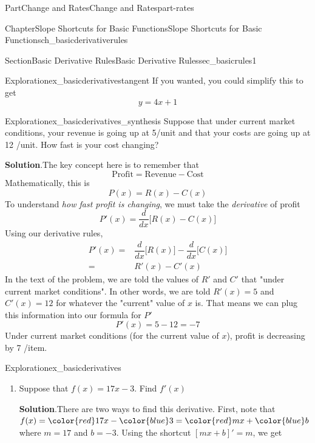 \documentclass[oneside,10pt,]{tufte-book}
\newcommand{\blocktitlefont}{\relax}
\numberwithin{equation}{chapter}
\newcommand{\red}[1]{   {\color{red}   #1}   }
\newcommand{\blue}[1]{  {\color{blue}  #1}  }
\newcommand{\ddx}[1]{ \dfrac{d}{dx} \Big[ #1 \Big]  }
\newcommand{\amp}{&}
\begin{document}
\begin{partptx}{Part}{Change and Rates}{}{Change and Rates}{}{}{part-rates}
\begin{chapterptx}{Chapter}{Slope Shortcuts for Basic Functions}{}{Slope Shortcuts for Basic Functions}{}{}{ch_basicderivativerules}
\begin{sectionptx}{Section}{Basic Derivative Rules}{}{Basic Derivative Rules}{}{}{sec_basicrules1}
\begin{exploration}{Exploration}{}{ex_basicderivativestangent}
If you wanted, you could simplify this to get%
\begin{equation*}
y = 4x + 1
\end{equation*}
%
\end{exploration}%
\begin{exploration}{Exploration}{}{ex_basicderivatives_synthesis}%
Suppose that under current market conditions, your revenue is going up at 5\textdollar{}\slash{}unit and that your costs are going up at 12 \textdollar{}\slash{}unit.  How fast is your cost changing?%
\par\smallskip%
\noindent\textbf{\blocktitlefont Solution}.\hypertarget{ex_basicderivatives_synthesis-2}{}\quad{}The key concept here is to remember that%
\begin{equation*}
\text{Profit} = \text{Revenue} - \text{Cost}
\end{equation*}
Mathematically, this is%
\begin{equation*}
P(x) = R(x) - C(x)
\end{equation*}
To understand \emph{how fast profit is changing}, we must take the \emph{derivative} of profit%
\begin{equation*}
P'(x) = \ddx{ R(x) - C(x) }
\end{equation*}
Using our derivative rules,%
\begin{align*}
P'(x) = \amp \ddx{R(x) } - \ddx{C(x)} \\
= \amp R'(x) - C'(x)
\end{align*}
In the text of the problem, we are told the values of \(R'\) and \(C'\) that "under current market conditions".  In other words, we are told \(R'(x) = 5\) and \(C'(x)=12\) for whatever the "current" value of \(x\) is.  That means we can plug this information into our formula for \(P'\)%
\begin{equation*}
P'(x) = 5 - 12 = -7
\end{equation*}
Under current market conditions (for the current value of \(x\)), profit is decreasing by 7 \textdollar{}\slash{}item.%
\end{exploration}%
\begin{exploration}{Exploration}{}{ex_basicderivatives}%
\begin{enumerate}[font=\bfseries,label=(\alph*),ref=\alph*]%
\item{}Suppose that \(f(x) = 17x - 3\).  Find \(f'(x)\)%
\par\smallskip%
\noindent\textbf{\blocktitlefont Solution}.\hypertarget{ex_basicderivatives-1-2}{}\quad{}There are two ways to find this derivative.  First, note that \(f(x) = \red{ 17} x - {\blue 3} = {\red m} x + {\blue b} \) where \(m=17\) and \(b=-3\).  Using the shortcut \([mx + b]' = m\), we get%

\end{enumerate}
\end{exploration}
\end{sectionptx}
\end{chapterptx}
\end{partptx}
\end{document}
